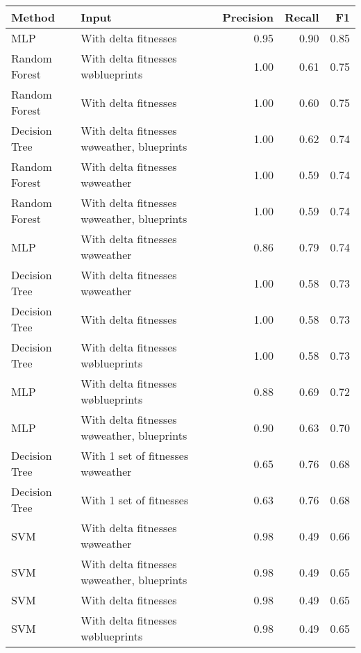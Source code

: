 \begin{tabular}{llrrr}
\toprule
        Method &                                           Input &  Precision &  Recall &   F1 \\
\midrule
           MLP &                            With delta fitnesses &       0.95 &    0.90 & 0.85 \\
 Random Forest &             With delta fitnesses w\o blueprints &       1.00 &    0.61 & 0.75 \\
 Random Forest &                            With delta fitnesses &       1.00 &    0.60 & 0.75 \\
 Decision Tree &    With delta fitnesses w\o weather, blueprints &       1.00 &    0.62 & 0.74 \\
 Random Forest &                With delta fitnesses w\o weather &       1.00 &    0.59 & 0.74 \\
 Random Forest &    With delta fitnesses w\o weather, blueprints &       1.00 &    0.59 & 0.74 \\
           MLP &                With delta fitnesses w\o weather &       0.86 &    0.79 & 0.74 \\
 Decision Tree &                With delta fitnesses w\o weather &       1.00 &    0.58 & 0.73 \\
 Decision Tree &                            With delta fitnesses &       1.00 &    0.58 & 0.73 \\
 Decision Tree &             With delta fitnesses w\o blueprints &       1.00 &    0.58 & 0.73 \\
           MLP &             With delta fitnesses w\o blueprints &       0.88 &    0.69 & 0.72 \\
           MLP &    With delta fitnesses w\o weather, blueprints &       0.90 &    0.63 & 0.70 \\
 Decision Tree &             With 1 set of fitnesses w\o weather &       0.65 &    0.76 & 0.68 \\
 Decision Tree &                         With 1 set of fitnesses &       0.63 &    0.76 & 0.68 \\
           SVM &                With delta fitnesses w\o weather &       0.98 &    0.49 & 0.66 \\
           SVM &    With delta fitnesses w\o weather, blueprints &       0.98 &    0.49 & 0.65 \\
           SVM &                            With delta fitnesses &       0.98 &    0.49 & 0.65 \\
           SVM &             With delta fitnesses w\o blueprints &       0.98 &    0.49 & 0.65 \\

\end{tabular}
